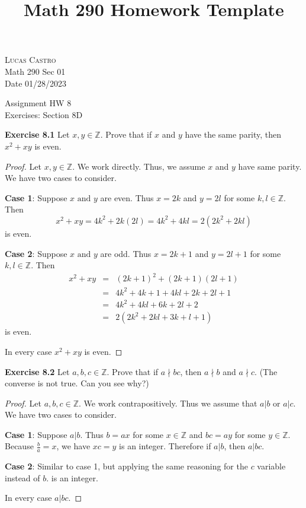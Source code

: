 \documentclass[12pt,oneside]{article}
\newenvironment{exercise}[1]{\vspace{.1in}\noindent\textbf{Exercise #1 \hspace{.05em}}}{}
\newcommand{\Z}{\mathbb{Z}}
\begin{document}
\title{Math 290 Homework Template}

\begin{flushright}
\textsc{Lucas Castro}  \\
Math 290 Sec 01\\
Date 01/28/2023
\end{flushright}

\begin{center}
\textsf{Assignment HW 8} \\
\textsf{Exercises: Section 8D}
\end{center}


\begin{exercise}{8.1}
Let $x,y \in \Z$. Prove that if $x$ and $y$ have the same parity, then $x^2 + xy$ is even.
\end{exercise}

\begin{proof}
Let $x,y \in \Z$. We work directly. Thus, we assume $x$ and $y$ have same parity. We have two cases to consider.

\textbf{Case 1}: Suppose $x \text{ and } y$ are even. Thus $x = 2k$ and $y = 2l$ for some $k,l \in \Z$. Then
\[x^2 + xy = 4k^2 + 2k(2l) = 4k^2 + 4kl = 2(2k^2 + 2kl)\]
is even.

\textbf{Case 2}: Suppose $x \text{ and } y$ are odd. Thus $x = 2k + 1$ and $y = 2l + 1$ for some $k,l \in \Z$. Then
\begin{eqnarray*}
x^2 + xy  &=& (2k + 1)^2 + (2k + 1)(2l + 1)\\
&=& 4k^2 + 4k + 1 + 4kl + 2k + 2l + 1 \\
&=& 4k^2 + 4kl + 6k + 2l + 2 \\
&=& 2(2k^2 + 2kl + 3k + l + 1)
\end{eqnarray*}
is even.

In every case $x^2 + xy$ is even.
\end{proof}



\begin{exercise}{8.2}
Let $a,b,c \in \Z$. Prove that if $a \nmid bc$, then $a \nmid b$ and $a \nmid c$. (The converse is not true. Can you see why?)
\end{exercise}

\begin{proof}
Let $a,b,c \in \Z$. We work contrapositively. Thus we assume that $a|b$ or $a|c$. We have two cases to consider.

\textbf{Case 1}: Suppose $a|b$. Thus $b=ax$ for some $x \in \Z$ and $bc = ay$ for some $y \in \Z$. Because $\frac{b}{a} = x$, we have $xc = y$ is an integer. Therefore if $a|b$, then $a|bc$.

\textbf{Case 2}: Similar to case 1, but applying the same reasoning for the $c$ variable instead of $b$.
is an integer.

In every case $a|bc$.
\end{proof}
\end{document}
